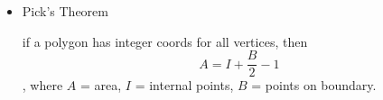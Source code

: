 \begin{itemize}

    \item Pick's Theorem
    
    if a polygon has integer coords for all vertices, then
    $$ A = I + \frac{B}{2} - 1 $$
    , where $A$ = area, $I$ = internal points, $B$ = points on boundary.

\end{itemize}
